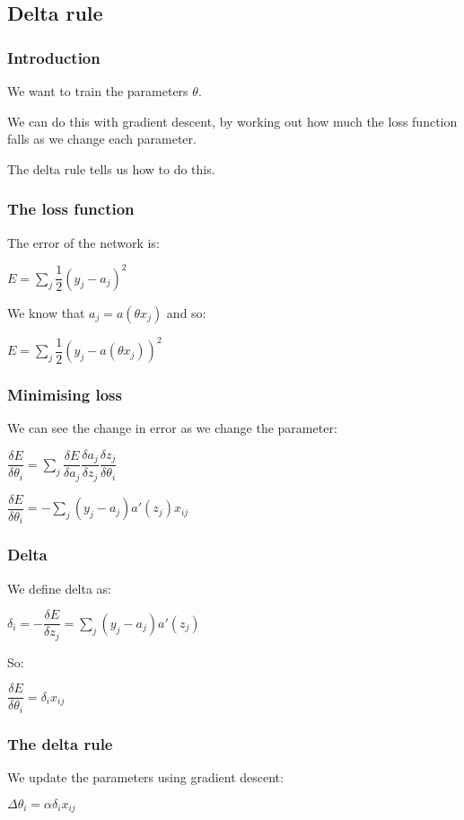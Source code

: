 
\subsection{Delta rule}

\subsubsection{Introduction}

We want to train the parameters \(\theta \).

We can do this with gradient descent, by working out how much the loss function falls as we change each parameter.

The delta rule tells us how to do this.

\subsubsection{The loss function}

The error of the network is:

\(E=\sum_j\dfrac{1}{2}(y_j-a_j)^2\)

We know that \(a_j=a(\theta x_j)\) and so:

\(E=\sum_j\dfrac{1}{2}(y_j-a(\theta x_j))^2\)

\subsubsection{Minimising loss}

We can see the change in error as we change the parameter:

\(\dfrac{\delta E}{\delta \theta_i }=\sum_j \dfrac{\delta E}{\delta a_j}\dfrac{\delta a_j}{\delta z_j}\dfrac{\delta z_j}{\delta \theta_i}\)

\(\dfrac{\delta E}{\delta \theta_i }=-\sum_j(y_j-a_j)a'(z_j)x_{ij}\)

\subsubsection{Delta}

We define delta as:

\(\delta_i=-\dfrac{\delta E}{\delta z_j}=\sum_j(y_j-a_j)a'(z_j)\)

So:

\(\dfrac{\delta E}{\delta \theta_i }=\delta_i x_{ij}\)

\subsubsection{The delta rule}

We update the parameters using gradient descent:

\(\Delta \theta_i=\alpha \delta_i x_{ij}\)

